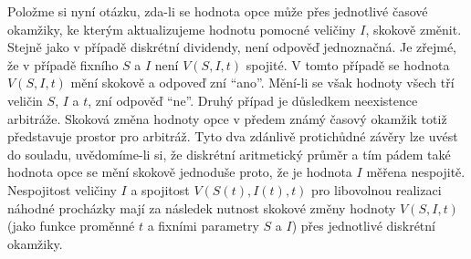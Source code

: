 \documentclass[a4paper]{book}
\begin{document}
Položme si nyní otázku, zda-li se hodnota opce může přes jednotlivé časové okamžiky, ke kterým aktualizujeme hodnotu pomocné veličiny $I$, skokově změnit. Stejně jako v případě diskrétní dividendy, není odpověď jednoznačná. Je zřejmé, že v případě fixního $S$ a $I$ není $V(S,I,t)$ spojité. V tomto případě se hodnota $V(S,I,t)$ mění skokově a odpoveď zní ``ano''. Mění-li se však hodnoty všech tří veličin $S$, $I$ a $t$, zní odpověď ``ne''. Druhý případ je důsledkem neexistence arbitráže. Skoková změna hodnoty opce v předem známý časový okamžik totiž představuje prostor pro arbitráž. Tyto dva zdánlivě protichůdné závěry lze uvést do souladu, uvědomíme-li si, že diskrétní aritmetický průměr a tím pádem také hodnota opce se mění skokově jednoduše proto, že je hodnota $I$ měřena nespojitě. Nespojitost veličiny $I$ a spojitost $V(S(t),I(t),t)$ pro libovolnou realizaci náhodné procházky mají za následek nutnost skokové změny hodnoty $V(S,I,t)$ (jako funkce proměnné $t$ a fixními parametry $S$ a $I$) přes jednotlivé diskrétní okamžiky.
\end{document}
